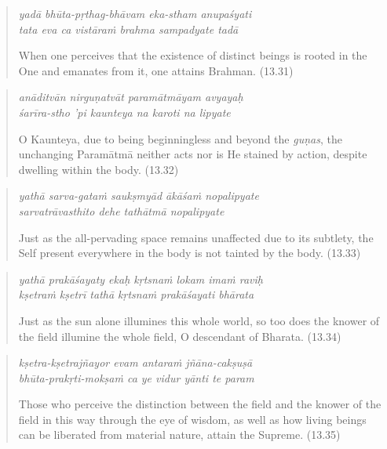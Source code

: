 \documentclass[12pt, twoside, openright]{memoir}
\begin{document}
\par
\begin{verse}
\textit{yadā bhūta-pṛthag-bhāvam eka-stham anupaśyati} \\
\textit{tata eva ca vistāraṁ brahma sampadyate tadā}

\noindent When one perceives that the existence of distinct beings is rooted in the One and emanates from it, one attains Brahman. (13.31)
\end{verse}
\par



\par
\begin{verse}
\textit{anāditvān nirguṇatvāt paramātmāyam avyayaḥ} \\
\textit{śarīra-stho ’pi kaunteya na karoti na lipyate}

\noindent O Kaunteya, due to being beginningless and beyond the \textit{guṇas}, the unchanging Paramātmā neither acts nor is He stained by action, despite dwelling within the body. (13.32)
\end{verse}
\par



\par
\begin{verse}
\textit{yathā sarva-gataṁ saukṣmyād ākāśaṁ nopalipyate} \\
\textit{sarvatrāvasthito dehe tathātmā nopalipyate}

\noindent Just as the all-pervading space remains unaffected due to its subtlety, the Self present everywhere in the body is not tainted by the body. (13.33)
\end{verse}
\par



\par
\begin{verse}
\textit{yathā prakāśayaty ekaḥ kṛtsnaṁ lokam imaṁ raviḥ} \\
\textit{kṣetraṁ kṣetrī tathā kṛtsnaṁ prakāśayati bhārata}

\noindent Just as the sun alone illumines this whole world, so too does the knower of the field illumine the whole field, O descendant of Bharata. (13.34)
\end{verse}
\par



\par
\begin{verse}
\textit{kṣetra-kṣetrajñayor evam antaraṁ jñāna-cakṣuṣā} \\
\textit{bhūta-prakṛti-mokṣaṁ ca ye vidur yānti te param}

\noindent Those who perceive the distinction between the field and the knower of the field in this way through the eye of wisdom, as well as how living beings can be liberated from material nature, attain the Supreme. (13.35)
\end{verse}
\par
\end{document}
